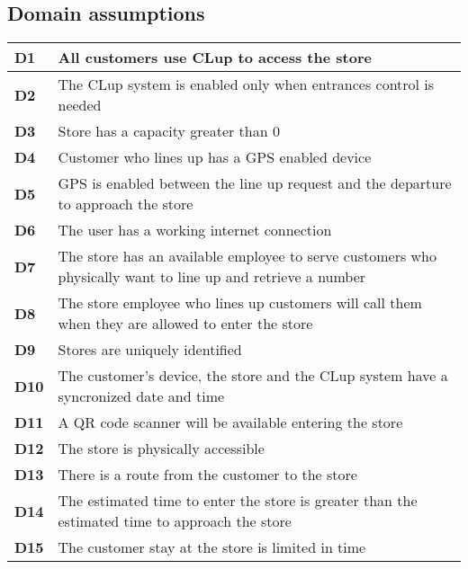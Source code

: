 \subsection{Domain assumptions}

    \begin{center}
        {\renewcommand{\arraystretch}{2}%
        \begin{tabular}{L{2cm}L{12cm}}
            \hline
            \textbf{D1} & All customers use CLup to access the store \\
            \hline
            \textbf{D2} & The CLup system is enabled only when entrances control is needed \\
            \hline
            \textbf{D3} & Store has a capacity greater than 0 \\
            \hline
            \textbf{D4} & Customer who lines up has a GPS enabled device \\
            \hline
            \textbf{D5} & GPS is enabled between the line up request and the departure to approach the store \\
            \hline
            \textbf{D6} & The user has a working internet connection \\
            \hline
            \textbf{D7} & The store has an available employee to serve customers who physically want to line up and retrieve a number \\
            \hline
            \textbf{D8} & The store employee who lines up customers will call them when they are allowed to enter the store \\
            \hline
            \textbf{D9} & Stores are uniquely identified \\
            \hline
            \textbf{D10} & The customer's device, the store and the CLup system have a syncronized date and time \\
            \hline
            \textbf{D11} & A QR code scanner will be available entering the store \\
            \hline
            \textbf{D12} & The store is physically accessible \\
            \hline
            \textbf{D13} & There is a route from the customer to the store \\
            \hline
            \textbf{D14} & The estimated time to enter the store is greater than the estimated time to approach the store \\
            \hline
            \textbf{D15} & The customer stay at the store is limited in time \\

\end{tabular}}
\end{center}
